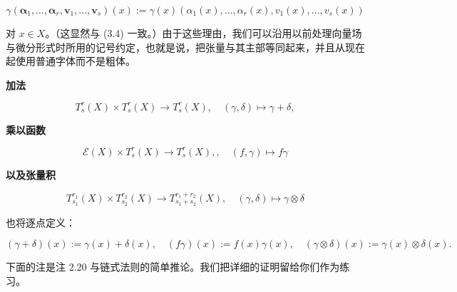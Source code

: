 \[
\gamma(\boldsymbol{\alpha}_{1}, \ldots, \boldsymbol{\alpha}_{r}, \boldsymbol{v}_{1}, \ldots, \boldsymbol{v}_{s})(x) := \gamma(x)\left(\alpha_{1}(x), \ldots, \alpha_{r}(x), v_{1}(x), \ldots, v_{s}(x)\right)
\]

对 $ x \in X $。（这显然与 (3.4) 一致。）由于这些理由，我们可以沿用以前处理向量场与微分形式时所用的记号约定，也就是说，把张量与其主部等同起来，并且从现在起使用普通字体而不是粗体。

\textbf{加法}

\[
T_{s}^{r}(X) \times T_{s}^{r}(X) \to T_{s}^{r}(X) ,\quad (\gamma, \delta) \mapsto \gamma + \delta,
\]

\textbf{乘以函数}

\[
\mathcal{E}(X) \times T_{s}^{r}(X) \to T_{s}^{r}(X), ,\quad (f, \gamma) \mapsto f\gamma
\]

\textbf{以及张量积}

\begin{equation}
T_{s_{1}}^{r_{1}}(X) \times T_{s_{2}}^{r_{2}}(X) \to T_{s_{1}+s_{2}}^{r_{1}+r_{2}}(X) ,\quad (\gamma, \delta) \mapsto \gamma \otimes \delta\tag{3.23}
\end{equation}

也将逐点定义：

\[
(\gamma + \delta)(x) := \gamma(x) + \delta(x), \quad (f\gamma)(x) := f(x)\gamma(x), \quad (\gamma \otimes \delta)(x) := \gamma(x) \otimes \delta(x) .
\]

下面的注是注 2.20 与链式法则的简单推论。我们把详细的证明留给你们作为练习。

